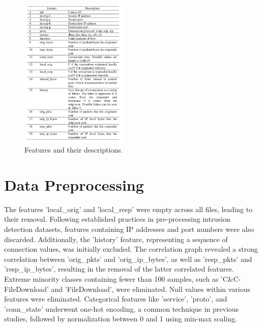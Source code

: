 \documentclass[conference,letterpaper]{IEEEtran}
\begin{document}
\begin{figure}[hbt!] 
\centering
\includegraphics[width=0.46\textwidth]{figures/Features table}
\caption{Features and their descriptions.}
\label{fig:feat}
\end{figure}


\section{Data Preprocessing}
The features 'local\_orig' and 'local\_resp' were empty across all files, leading to their removal. Following established practices in pre-processing intrusion detection datasets, features containing IP addresses and port numbers were also discarded. Additionally, the 'history' feature, representing a sequence of connection values, was initially excluded. The correlation graph revealed a strong correlation between 'orig\_pkts' and 'orig\_ip\_bytes', as well as 'resp\_pkts' and 'resp\_ip\_bytes', resulting in the removal of the latter correlated features. Extreme minority classes containing fewer than 100 samples, such as 'C\&C-FileDownload' and 'FileDownload', were eliminated. Null values within various features were eliminated. Categorical features like 'service', 'proto', and 'conn\_state' underwent one-hot encoding, a common technique in previous studies, followed by normalization between 0 and 1 using min-max scaling.
\end{document}

